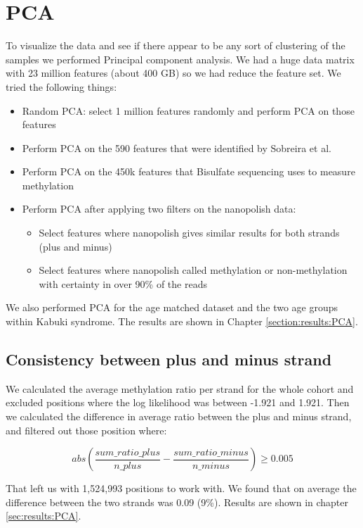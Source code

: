 \section{PCA}
\label{section:method:t-test}
To visualize the data and see if there appear to be any sort of clustering of the samples we performed Principal component analysis. We had a huge data matrix with 23 million features (about 400 GB) so we had reduce the feature set. 
%
We tried the following things:
\begin{itemize}
    \item Random PCA: select 1 million features randomly and perform PCA on those features
    \item Perform PCA on the 590 features that were identified by Sobreira et al.
    \item Perform PCA on the 450k features that Bisulfate sequencing uses to measure methylation
    \item Perform PCA after applying two filters on the nanopolish data:
        \begin{itemize}
            \item  Select features where nanopolish gives similar results for both strands (plus and minus)
            \item Select features where nanopolish called methylation or non-methylation with certainty in over 90\% of the reads
        \end{itemize}
\end{itemize}

 
 We also performed PCA for the age matched dataset and the two age groups within Kabuki syndrome. The results are shown in Chapter \ref{section:results:PCA}.

\subsection{Consistency between plus and minus strand}
We calculated the average methylation ratio per strand for the whole cohort and excluded positions where the log likelihood was between -1.921 and 1.921. Then we calculated the difference in average ratio between the plus and minus strand, and filtered out those position where:

\begin{equation*}
    abs(\frac{sum\_ratio\_plus}{n\_plus} - \frac{sum\_ratio\_minus}{n\_minus}) \geq 0.005
\end{equation*}


That left us with 1,524,993 positions to work with. We found that on average the difference between the two strands was 0.09 (9\%). Results are shown in chapter \ref{sec:results:PCA}.

